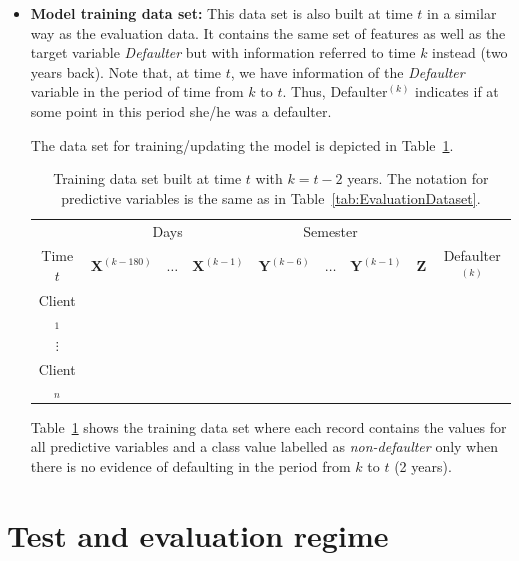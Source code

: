 \documentclass{article}
\theoremstyle{theorem}
\theoremstyle{definition}
\newcommand{\X}{\mathbf{X}}
\newcommand{\Y}{\mathbf{Y}}
\newcommand{\Z}{\mathbf{Z}}
\begin{document}
\begin{itemize}
\item \textbf{Model training data set:}  This data set is also built at time $t$ in a similar way as the evaluation data. It contains the same set of features as well as the target variable \textit{Defaulter} but with information referred to time $k$ instead (two years back). Note that, at time $t$, we have information of the \textit{Defaulter} variable in the period of time from $k$ to $t$. Thus,  Defaulter$^{(k)}$ indicates if at some point in this period she/he was a defaulter.

The data set for training/updating the model is depicted in Table~\ref{tab:TrainingDataset}.
\begin{table}[ht!]
\centering
\begin{tabular}{c|ccc|ccc|c|c}
	&\multicolumn{3}{c|}{Days} & \multicolumn{3}{c|}{Semester} & \\
     Time $t$              & $\X^{(k-180)}$ & $\ldots$ & $\X^{(k-1)} $ & $\Y^{(k-6)}$  & $\ldots$ & $\Y^{(k-1)} $ & $\Z$ & Defaulter$^{(k)}$\\  
\hline
Client$_1$  &                                                  &              &                     &                               &                     &        &  \\ 
$\vdots$      &                                                 &               &                     &                                &                     &       & \\ 
Client$_n$  &                                                &               &                     &                                &                     &     & \\ 
\end{tabular} 
\caption{Training data set built at time $t$ with $k=t - 2$ years.  The notation for predictive variables is the same as in Table~\ref{tab:EvaluationDataset}.}
\label{tab:TrainingDataset} 
\end{table}

Table~\ref{tab:TrainingDataset} shows the training data set where each record contains the values for all predictive variables and a class value labelled as \emph{non-defaulter} only when there is no evidence of defaulting in the period from $k$ to $t$ (2 years). 

\end{itemize}

\section{Test and evaluation regime}
\end{document}
